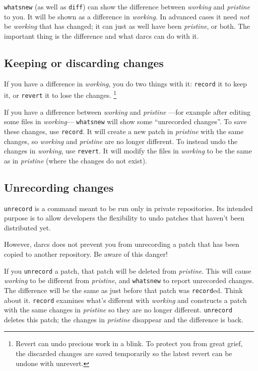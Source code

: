 	\verb!whatsnew! (as well as \verb!diff!) can show
	the difference between \emph{working} and \emph{pristine} to you.
	It will be shown as a difference in \emph{working}.
	In advanced cases it need \emph{not} be \emph{working} that has changed;
	it can just as well have been \emph{pristine}, or both.
	The important thing is the difference and what darcs can do with it.

\subsection{Keeping or discarding changes}
    If you have a difference in \emph{working}, you do two things
    with it: \verb!record! it to keep it, or \verb!revert! it to lose the changes.%
		\footnote{%
		Revert can undo precious work in a blink.
		To protect you from great grief,
		the discarded changes are saved temporarily
		so the latest revert can be undone with unrevert.}

	If you have a difference between \emph{working} and \emph{pristine}%
	---for example after editing some files in \emph{working}---%
	\verb!whatsnew! will show some ``unrecorded changes''.
	To save these changes, use \verb!record!.
	It will create a new patch in \emph{pristine} with the same changes,
	so \emph{working} and \emph{pristine} are no longer different.
	To instead undo the changes in \emph{working}, use \verb!revert!.
	It will modify the files in \emph{working} to be the same as in \emph{pristine}
	(where the changes do not exist).


\subsection{Unrecording changes}
    \verb!unrecord! is a command meant to be run only in private
    repositories. Its intended purpose is to allow developers the flexibility
    to undo patches that haven't been distributed yet.

    However, darcs does not prevent you from unrecording a patch that
    has been copied to another repository. Be aware of this danger!

	If you \verb!unrecord! a patch, that patch will be deleted from \emph{pristine}.
	This will cause \emph{working} to be different from \emph{pristine},
	and \verb!whatsnew! to report unrecorded changes.
	The difference will be the same as just before that patch was \verb!record!ed.
	Think about it.
	\verb!record! examines what's different with \emph{working}
	and constructs a patch with the same changes in \emph{pristine}
	so they are no longer different.
	\verb!unrecord! deletes this patch;
	the changes in \emph{pristine} disappear and the difference is back.

